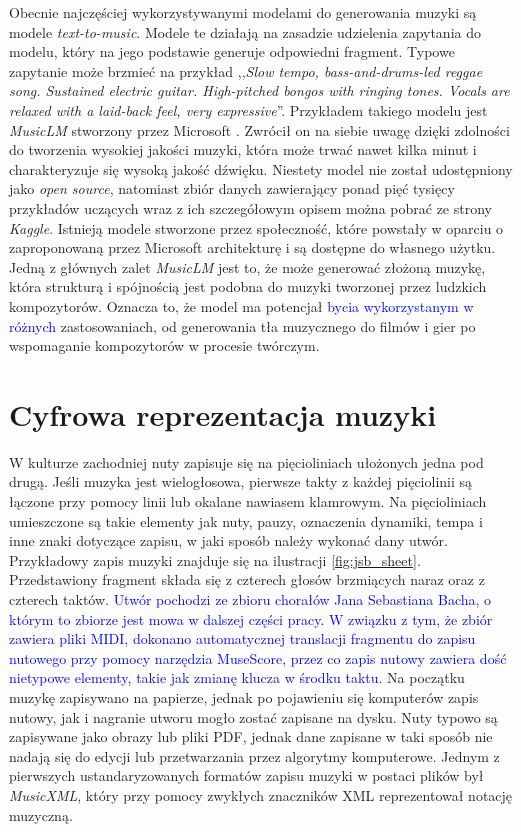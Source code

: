 \documentclass[data-science]{agh-wi} %
\begin{document}
Obecnie najczęściej wykorzystywanymi modelami do generowania muzyki są modele \textit{text-to-music}. Modele te działają na zasadzie udzielenia zapytania do modelu, który na jego podstawie generuje odpowiedni fragment. Typowe zapytanie może brzmieć na przykład ,,\textit{Slow tempo, bass-and-drums-led reggae song. Sustained electric guitar. High-pitched bongos with ringing tones. Vocals are relaxed with a laid-back feel, very expressive}''. Przykładem takiego modelu jest \textit{MusicLM} stworzony przez Microsoft \cite*{agostinelli2023musiclm}. Zwrócił on na siebie uwagę dzięki zdolności do tworzenia wysokiej jakości muzyki, która może trwać nawet kilka minut i charakteryzuje się wysoką jakość dźwięku. Niestety model nie został udostępniony jako \textit{open source}, natomiast zbiór danych zawierający ponad pięć tysięcy przykładów uczących wraz z ich szczegółowym opisem można pobrać ze strony \textit{Kaggle}. Istnieją modele stworzone przez społeczność, które powstały w oparciu o zaproponowaną przez Microsoft architekturę i są dostępne do własnego użytku. Jedną z głównych zalet \textit{MusicLM} jest to, że może generować złożoną muzykę, która strukturą i spójnością jest podobna do muzyki tworzonej przez ludzkich kompozytorów. Oznacza to, że model ma potencjał \textcolor{blue}{bycia wykorzystanym w różnych} zastosowaniach, od generowania tła muzycznego do filmów i gier po wspomaganie kompozytorów w procesie twórczym.


\section{Cyfrowa reprezentacja muzyki}\label{sec:muzyka_cyfrowa}
W kulturze zachodniej nuty zapisuje się na pięcioliniach ułożonych jedna pod drugą. Jeśli muzyka jest wielogłosowa, pierwsze takty z każdej pięciolinii są łączone przy pomocy linii lub okalane nawiasem klamrowym. Na pięcioliniach umieszczone są takie elementy jak nuty, pauzy, oznaczenia dynamiki, tempa i inne znaki dotyczące zapisu, w jaki sposób należy wykonać dany utwór. Przykładowy zapis muzyki znajduje się na ilustracji \ref*{fig:jsb_sheet}. Przedstawiony fragment składa się z czterech głosów brzmiących naraz oraz z czterech taktów. \textcolor{blue}{Utwór pochodzi ze zbioru chorałów Jana Sebastiana Bacha, o którym to zbiorze jest mowa w dalszej części pracy. W związku z tym, że zbiór zawiera pliki MIDI, dokonano automatycznej translacji fragmentu do zapisu nutowego przy pomocy narzędzia MuseScore, przez co zapis nutowy zawiera dość nietypowe elementy, takie jak zmianę klucza w środku taktu.} Na początku muzykę zapisywano na papierze, jednak po pojawieniu się komputerów zapis nutowy, jak i nagranie utworu mogło zostać zapisane na dysku. Nuty typowo są zapisywane jako obrazy lub pliki PDF, jednak dane zapisane w taki sposób nie nadają się do edycji lub przetwarzania przez algorytmy komputerowe. Jednym z pierwszych ustandaryzowanych formatów zapisu muzyki w postaci plików był \textit{MusicXML}, który przy pomocy zwykłych znaczników XML reprezentował notację muzyczną.
\end{document}

